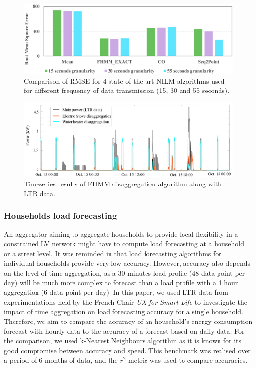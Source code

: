 \documentclass[conference]{IEEEtran}
\begin{document}
%   

\begin{figure}[h]
	\centering
	\includegraphics[width=0.85\columnwidth]{Images/NILMComparison}
	\caption{Comparison of  RMSE for 4 state of the art NILM algorithms used for different frequency of data transmission (15, 30 and 55 seconds).}
	\label{Fig:NILMComparison}
\end{figure}



\begin{figure}[h]
	\centering
	\includegraphics[width=0.85\columnwidth]{Images/NILMCurves}
	\caption{Timeseries results of FHMM disaggregation algorithm along with LTR data.}
	\label{Fig:NILMCurves}
\end{figure}


\subsubsection{Households load forecasting}
An aggregator aiming to aggregate households to provide local flexibility in a constrained LV network might have to compute load forecasting at a household or a street level.  It was reminded in \cite{IEEE:ReviewSmartMeterData} that load forecasting algorithms for individual households provide very low accuracy.
However, accuracy also depends on the level of time aggregation, as a 30 minutes load profile (48 data point per day) will be much more complex to forecast than a load profile with a 4 hour aggregation (6 data point per day). In this paper, we used LTR data from experimentations held by the French Chair \textit{UX for Smart Life} to investigate the impact of time aggregation on load forecasting accuracy for a single household. Therefore, we aim to compare the accuracy of an household's energy consumption forecast with hourly data to the accuracy of a forecast based on daily data. For the comparison, we used k-Nearest Neighbours algorithm as it is known for its good compromise between accuracy and speed.
This benchmark was realised over a period of 6 months of data, and the $r^2$ metric was used to compare  accuracies.
\end{document}
